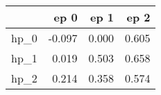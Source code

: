 \begin{tabular}{lrrr}
\toprule
{} &   ep 0 &   ep 1 &   ep 2 \\
\midrule
hp\_0 & -0.097 &  0.000 &  0.605 \\
hp\_1 &  0.019 &  0.503 &  0.658 \\
hp\_2 &  0.214 &  0.358 &  0.574 \\
\bottomrule
\end{tabular}
